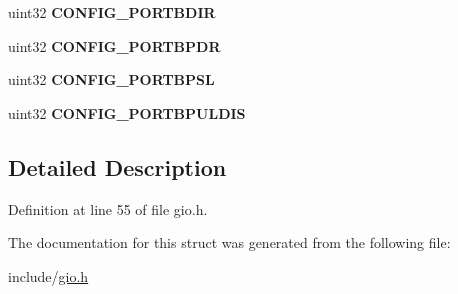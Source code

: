 \begin{DoxyCompactItemize}
\item 
\mbox{\label{structgio__config__reg_ab40843c053a62c0a11499d9bdeec47db}} 
uint32 {\bfseries C\+O\+N\+F\+I\+G\+\_\+\+P\+O\+R\+T\+B\+D\+IR}
\item 
\mbox{\label{structgio__config__reg_adbfd6af4ce900fef95aafa9debdeb9bb}} 
uint32 {\bfseries C\+O\+N\+F\+I\+G\+\_\+\+P\+O\+R\+T\+B\+P\+DR}
\item 
\mbox{\label{structgio__config__reg_ace2b4519a0b67136138c0989d6489143}} 
uint32 {\bfseries C\+O\+N\+F\+I\+G\+\_\+\+P\+O\+R\+T\+B\+P\+SL}
\item 
\mbox{\label{structgio__config__reg_a8f3da09c2592fb511695fcf67201fd52}} 
uint32 {\bfseries C\+O\+N\+F\+I\+G\+\_\+\+P\+O\+R\+T\+B\+P\+U\+L\+D\+IS}
\end{DoxyCompactItemize}


\subsection{Detailed Description}


Definition at line 55 of file gio.\+h.



The documentation for this struct was generated from the following file\+:\begin{DoxyCompactItemize}
\item 
include/\mbox{\hyperlink{gio_8h}{gio.\+h}}\end{DoxyCompactItemize}
